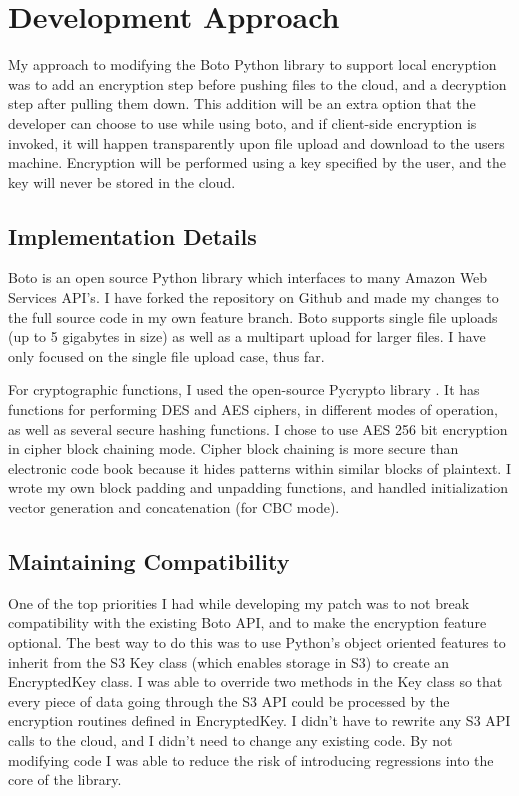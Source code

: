 \section{Development Approach}

My approach to modifying the Boto Python library to support local encryption was to add an encryption step before pushing 
files to the cloud, and a decryption step after pulling them down.
This addition will be an extra option that the developer can choose to use while using boto, and if client-side encryption
is invoked, it will happen transparently upon file upload and download to the users machine. Encryption will be performed
using a key specified by the user, and the key will never be stored in the cloud.

\subsection{Implementation Details}

Boto is an open source Python library which interfaces to many Amazon Web Services API's. I have forked the repository 
on Github and made my changes to the full source code in my own feature branch. Boto supports single file uploads 
(up to 5 gigabytes in size) as well as a multipart upload for larger files. I have only focused on the single file upload case, thus far.

For cryptographic functions, I used the open-source Pycrypto library \cite{pycrypto}. It has functions 
for performing DES and AES ciphers, in different modes of operation, as well as several secure hashing functions. I chose to 
use AES 256 bit encryption in cipher block chaining mode. Cipher block chaining is more secure than electronic code book 
because it hides patterns within similar blocks of plaintext. I wrote my own block padding and unpadding functions, and handled initialization vector generation and concatenation (for CBC mode).

\subsection{Maintaining Compatibility}
One of the top priorities I had while developing my patch was to not break compatibility with the existing Boto API, and to make the 
encryption feature optional. The best way to do this was to use Python's object oriented features to inherit from the S3 Key class 
(which enables storage in S3) to create an EncryptedKey class. I was able to override two methods in the Key class so 
that every piece of data going through the S3 API could be processed by the encryption routines defined in EncryptedKey. 
I didn't have to rewrite any S3 API calls to the cloud, and I didn't need to change any existing code.
By not modifying code I was able to reduce the risk of introducing regressions into the core of the library.


